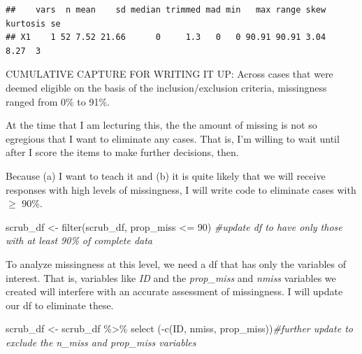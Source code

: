 \documentclass[
  11pt,
]{book}
\newenvironment{Shaded}{\begin{snugshade}}{\end{snugshade}}
\newcommand{\CommentTok}[1]{\textcolor[rgb]{0.56,0.35,0.01}{\textit{#1}}}
\newcommand{\DecValTok}[1]{\textcolor[rgb]{0.00,0.00,0.81}{#1}}
\newcommand{\FunctionTok}[1]{\textcolor[rgb]{0.00,0.00,0.00}{#1}}
\newcommand{\NormalTok}[1]{#1}
\newcommand{\OtherTok}[1]{\textcolor[rgb]{0.56,0.35,0.01}{#1}}
\newcommand{\SpecialCharTok}[1]{\textcolor[rgb]{0.00,0.00,0.00}{#1}}
\begin{document}
\begin{verbatim}
##    vars  n mean    sd median trimmed mad min   max range skew kurtosis se
## X1    1 52 7.52 21.66      0     1.3   0   0 90.91 90.91 3.04     8.27  3
\end{verbatim}

\begin{Shaded}
\end{Shaded}

CUMULATIVE CAPTURE FOR WRITING IT UP: Across cases that were deemed eligible on the basis of the inclusion/exclusion criteria, missingness ranged from 0\% to 91\%.

At the time that I am lecturing this, the the amount of missing is not so egregious that I want to eliminate any cases. That is, I'm willing to wait until after I score the items to make further decisions, then.

Because (a) I want to teach it and (b) it is quite likely that we will receive responses with high levels of missingness, I will write code to eliminate cases with \(\geq\) 90\%.

\begin{Shaded}
\begin{Highlighting}[]
\NormalTok{scrub\_df }\OtherTok{\textless{}{-}} \FunctionTok{filter}\NormalTok{(scrub\_df, prop\_miss }\SpecialCharTok{\textless{}=} \DecValTok{90}\NormalTok{)  }\CommentTok{\#update df to have only those with at least 90\% of complete data}
\end{Highlighting}
\end{Shaded}

To analyze missingness at this level, we need a df that has only the variables of interest. That is, variables like \emph{ID} and the \emph{prop\_miss} and \emph{nmiss} variables we created will interfere with an accurate assessment of missingness. I will update our df to eliminate these.

\begin{Shaded}
\begin{Highlighting}[]
\NormalTok{scrub\_df }\OtherTok{\textless{}{-}}\NormalTok{ scrub\_df }\SpecialCharTok{\%\textgreater{}\%}
  \FunctionTok{select}\NormalTok{ (}\SpecialCharTok{{-}}\FunctionTok{c}\NormalTok{(ID, nmiss, prop\_miss))}\CommentTok{\#further update to exclude the n\_miss and prop\_miss variables}
\end{Highlighting}
\end{Shaded}
\end{document}
